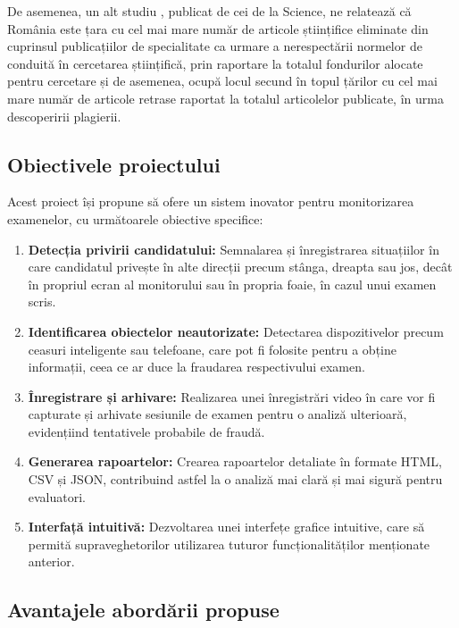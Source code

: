 \documentclass[12pt,a4paper]{article}
\begin{document}
De asemenea, un alt studiu \cite{science}, publicat de cei de la Science, ne
relatează că România este țara cu cel mai mare număr de articole
științifice eliminate din cuprinsul publicațiilor de specialitate ca
urmare a nerespectării normelor de conduită în cercetarea științifică,
prin raportare la totalul fondurilor alocate pentru cercetare și de
asemenea, ocupă locul secund în topul țărilor cu cel mai mare număr de
articole retrase raportat la totalul articolelor publicate, în urma
descoperirii plagierii.

\subsection{Obiectivele proiectului}

Acest proiect își propune să ofere un sistem inovator pentru monitorizarea examenelor, cu următoarele obiective specifice:

\begin{enumerate}[label=\arabic*.]
    \item \textbf{Detecția privirii candidatului:} Semnalarea și înregistrarea situațiilor
    în care candidatul privește în alte direcții precum stânga, dreapta sau jos, 
    decât în propriul ecran al monitorului sau în propria foaie, în cazul unui examen scris.
    
    \item \textbf{Identificarea obiectelor neautorizate:} Detectarea dispozitivelor precum
    ceasuri inteligente sau telefoane, care pot fi folosite pentru a obține informații, 
    ceea ce ar duce la fraudarea respectivului examen.
    
    \item \textbf{Înregistrare și arhivare:} Realizarea unei înregistrări video în care 
    vor fi capturate și arhivate sesiunile de examen pentru o analiză ulterioară, 
    evidențiind tentativele probabile de fraudă.
    
    \item \textbf{Generarea rapoartelor:} Crearea rapoartelor detaliate în formate HTML, CSV și JSON,
    contribuind astfel la o analiză mai clară și mai sigură pentru evaluatori.
    
    \item \textbf{Interfață intuitivă:} Dezvoltarea unei interfețe grafice intuitive, care să permită
    supraveghetorilor utilizarea tuturor funcționalităților menționate anterior.
\end{enumerate}

\subsection{Avantajele abordării propuse}
\end{document}
